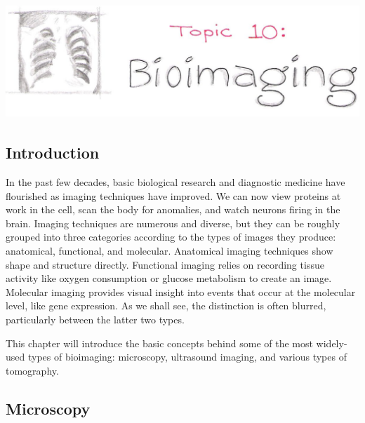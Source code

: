 \setcounter{chapter}{10}
\setcounter{section}{0}
\setcounter{figure}{0}
\setcounter{equation}{0}
\setcounter{table}{0}
\chapter*{\includegraphics[width=\textwidth]{./figures/Topic10/Topic10.jpg}}

\section{Introduction}

In the past few decades, basic biological research and diagnostic medicine have flourished as imaging techniques have improved.  We can now view proteins at work in the cell, scan the body for anomalies, and watch neurons firing in the brain.  Imaging techniques are numerous and diverse, but they can be roughly grouped into three categories according to the types of images they produce: anatomical, functional, and molecular.  Anatomical imaging techniques show shape and structure directly.  Functional imaging relies on recording tissue activity like oxygen consumption or glucose metabolism to create an image.  Molecular imaging provides visual insight into events that occur at the molecular level, like gene expression.  As we shall see, the distinction is often blurred, particularly between the latter two types.

This chapter will introduce the basic concepts behind some of the most widely-used types of bioimaging: microscopy, ultrasound imaging, and various types of tomography.


\section{Microscopy}

